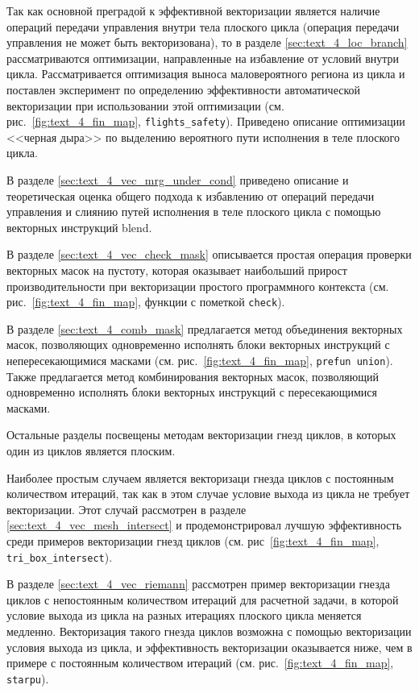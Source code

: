 Так как основной преградой к эффективной векторизации является наличие операций передачи управления внутри тела плоского цикла (операция передачи управления не может быть векторизована), то в разделе \ref{sec:text_4_loc_branch} рассматриваются оптимизации, направленные на избавление от условий внутри цикла.
Рассматривается оптимизация выноса маловероятного региона из цикла и поставлен эксперимент по определению эффективности автоматической векторизации при использовании этой оптимизации (см. рис.~\ref{fig:text_4_fin_map}, \texttt{flights\_safety}).
Приведено описание оптимизации <<черная дыра>> по выделению вероятного пути исполнения в теле плоского цикла.

В разделе \ref{sec:text_4_vec_mrg_under_cond} приведено описание и теоретическая оценка общего подхода к избавлению от операций передачи управления и слиянию путей исполнения в теле плоского цикла с помощью векторных инструкций blend.

В разделе \ref{sec:text_4_vec_check_mask} описывается простая операция проверки векторных масок на пустоту, которая оказывает наибольший прирост производительности при векторизации простого программного контекста (см. рис.~\ref{fig:text_4_fin_map}, функции с пометкой \texttt{check}).

В разделе \ref{sec:text_4_comb_mask} предлагается метод объединения векторных масок, позволяющих одновременно исполнять блоки векторных инструкций с непересекающимися масками (см. рис.~\ref{fig:text_4_fin_map}, \texttt{prefun union}).
Также предлагается метод комбинирования векторных масок, позволяющий одновременно исполнять блоки векторных инструкций с пересекающимися масками.

Остальные разделы посвещены методам векторизации гнезд циклов, в которых один из циклов является плоским.

Наиболее простым случаем является векторизаци гнезда циклов с постоянным количеством итераций, так как в этом случае условие выхода из цикла не требует векторизации.
Этот случай рассмотрен в разделе \ref{sec:text_4_vec_mesh_intersect} и продемонстрировал лучшую эффективность среди примеров векторизации гнезд циклов (см. рис~\ref{fig:text_4_fin_map}, \texttt{tri\_box\_intersect}).

В разделе \ref{sec:text_4_vec_riemann} рассмотрен пример векторизации гнезда циклов с непостоянным количеством итераций для расчетной задачи, в которой условие выхода из цикла на разных итерациях плоского цикла меняется медленно.
Векторизация такого гнезда циклов возможна с помощью векторизации условия выхода из цикла, и эффективность векторизации оказывается ниже, чем в примере с постоянным количеством итераций (см. рис.~\ref{fig:text_4_fin_map}, \texttt{starpu}).

